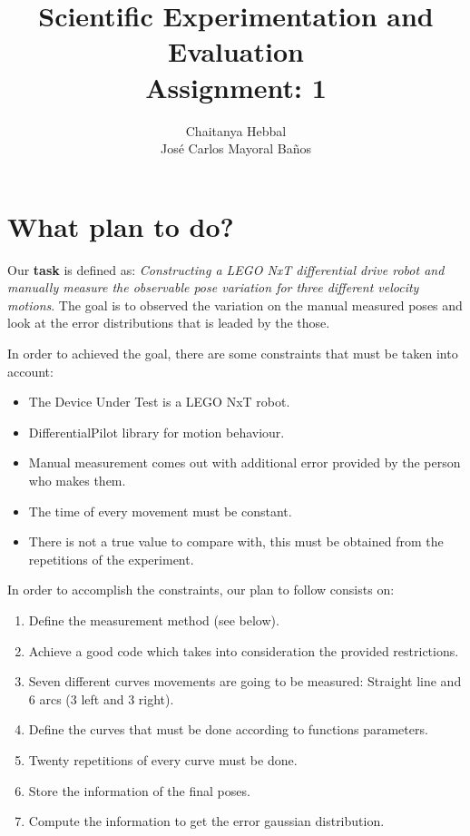 \documentclass[10pt]{scrartcl}
\title{Scientific Experimentation and Evaluation\\
	   \small{Assignment: 1}}
\author{Chaitanya Hebbal\\
		Jos\'e Carlos Mayoral Ba\~nos}
\begin{document}
	\maketitle
\section*{What plan to do?}

Our \textbf{task} is defined as: \textit{Constructing a LEGO NxT differential drive robot and manually measure the observable pose variation for three different velocity motions}. The goal is to observed the variation on the manual measured poses and look at the error distributions that is leaded by the those.

In order to achieved the goal, there are some constraints that must be taken into account:

\begin{itemize}
	\item The Device Under Test is a LEGO NxT robot.
	\item DifferentialPilot library for motion behaviour.
	\item Manual measurement comes out with additional error provided by the person who makes them.
	\item The time of every movement must be constant.
	\item There is not a true value to compare with, this must be obtained from the repetitions of the experiment.
\end{itemize}

In order to accomplish the constraints, our plan to follow consists on:

\begin{enumerate}
	\item Define the measurement method (see below).
	\item Achieve a good code which takes into consideration the provided restrictions.
	\item Seven different curves movements are going to be measured: Straight line and 6 arcs (3 left and 3 right).
	\item Define the curves that must be done according to functions parameters.
	\item Twenty repetitions of every curve must be done.
	\item Store the information of the final poses.
	\item Compute the information to get the error gaussian distribution.
\end{enumerate}
\end{document}
